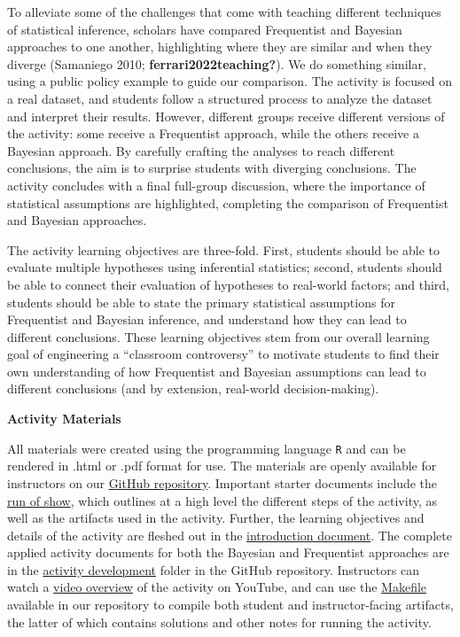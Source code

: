 \documentclass[
  12pt,
  letterpaper,
  DIV=11,
  numbers=noendperiod]{scrartcl}
\begin{document}
To alleviate some of the challenges that come with teaching different
techniques of statistical inference, scholars have compared Frequentist
and Bayesian approaches to one another, highlighting where they are
similar and when they diverge (Samaniego 2010;
\textbf{ferrari2022teaching?}). We do something similar, using a public
policy example to guide our comparison. The activity is focused on a
real dataset, and students follow a structured process to analyze the
dataset and interpret their results. However, different groups receive
different versions of the activity: some receive a Frequentist approach,
while the others receive a Bayesian approach. By carefully crafting the
analyses to reach different conclusions, the aim is to surprise students
with diverging conclusions. The activity concludes with a final
full-group discussion, where the importance of statistical assumptions
are highlighted, completing the comparison of Frequentist and Bayesian
approaches.

The activity learning objectives are three-fold. First, students should
be able to evaluate multiple hypotheses using inferential statistics;
second, students should be able to connect their evaluation of
hypotheses to real-world factors; and third, students should be able to
state the primary statistical assumptions for Frequentist and Bayesian
inference, and understand how they can lead to different conclusions.
These learning objectives stem from our overall learning goal of
engineering a ``classroom controversy'' to motivate students to find
their own understanding of how Frequentist and Bayesian assumptions can
lead to different conclusions (and by extension, real-world
decision-making).

\textbf{Activity Materials}

All materials were created using the programming language \texttt{R} and
can be rendered in .html or .pdf format for use. The materials are
openly available for instructors on our
\href{https://github.com/bayes-bats/tier2-freq-bayes}{GitHub
repository}. Important starter documents include the
\href{https://github.com/bayes-bats/tier2-freq-bayes/blob/main/development/run-of-show.md}{run
of show}, which outlines at a high level the different steps of the
activity, as well as the artifacts used in the activity. Further, the
learning objectives and details of the activity are fleshed out in the
\href{https://github.com/bayes-bats/tier2-freq-bayes/blob/main/development/01-introduction-main.qmd}{introduction
document}. The complete applied activity documents for both the Bayesian
and Frequentist approaches are in the
\href{https://github.com/bayes-bats/tier2-freq-bayes/tree/main/development}{activity
development} folder in the GitHub repository. Instructors can watch a
\href{https://www.youtube.com/watch?v=dwNLcFqQqnE}{video overview} of
the activity on YouTube, and can use the
\href{https://github.com/bayes-bats/tier2-freq-bayes/blob/main/development/Makefile}{Makefile}
available in our repository to compile both student and
instructor-facing artifacts, the latter of which contains solutions and
other notes for running the activity.
\end{document}
